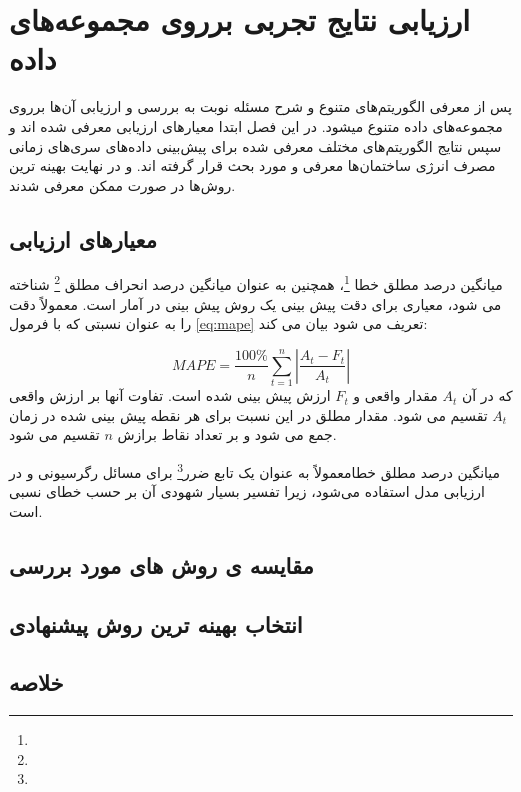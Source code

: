 \chapter{ارزیابی نتایج تجربی برروی مجموعه‌های داده}

پس از معرفی الگوریتم‌های متنوع و شرح مسئله نوبت به بررسی و ارزیابی آن‌ها برروی مجموعه‌های داده‌ متنوع میشود. در این فصل ابتدا معیار‌های ارزیابی معرفی شده اند و سپس 
نتایج الگوریتم‌های مختلف معرفی شده برای پیش‌بینی داده‌های سری‌های زمانی مصرف انرژی ساختمان‌ها معرفی و مورد بحث قرار گرفته اند.
و در نهایت بهینه ترین روش‌ها در صورت ممکن معرفی شدند.
\section{معیار‌های ارزیابی}

میانگین درصد مطلق خطا \footnote{}، همچنین به عنوان میانگین درصد انحراف مطلق \footnote{}
 شناخته می شود، معیاری برای دقت پیش بینی یک روش پیش بینی در آمار است. معمولاً دقت را به عنوان نسبتی که با فرمول \ref{eq:mape} تعریف می شود بیان می کند:

 \begin{equation}\label{eq:mape}
    MAPE = \frac{100\%}{n}\sum_{t=1}^{n}\left |\frac{A_t - F_t}{A_t}\right|
\end{equation}
\noindent
که در آن $A_t$ مقدار واقعی و $F_t$ ارزش پیش بینی شده است. تفاوت آنها بر ارزش واقعی $A_t$ تقسیم می شود. مقدار مطلق در این نسبت برای هر نقطه پیش بینی شده
 در زمان جمع می شود
 و بر تعداد نقاط برازش $n$ تقسیم می شود.

\noindent
 میانگین درصد مطلق خطا\footnotemark[1] معمولاً به عنوان یک تابع ضرر\footnote{} برای مسائل رگرسیونی و در ارزیابی مدل استفاده می‌شود،
  زیرا تفسیر بسیار شهودی آن بر حسب خطای نسبی است.

\section{مقایسه ی روش های مورد بررسی}
\section{انتخاب بهینه ترین روش پیشنهادی}
\section{خلاصه}
